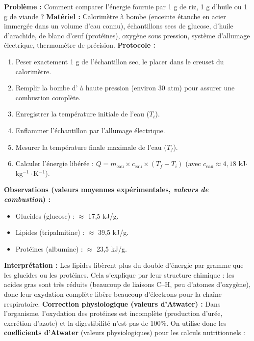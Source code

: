 \documentclass[11pt]{article}
\newcommand{\cle}[1]{{\popxbold\color{popdark}#1}}
\begin{document}
\begin{experience}
\textbf{Problème :} Comment comparer l'énergie fournie par 1 g de riz, 1 g d'huile ou 1 g de viande ?
\textbf{Matériel :} Calorimètre à bombe (enceinte étanche en acier immergée dans un volume d'eau connu), échantillons secs de glucose, d'huile d'arachide, de blanc d'œuf (protéines), oxygène sous pression, système d'allumage électrique, thermomètre de précision.
\textbf{Protocole :}
\begin{enumerate}
    \item Peser exactement 1 g de l'échantillon sec, le placer dans le creuset du calorimètre.
    \item Remplir la bombe d' à haute pression (environ 30 atm) pour assurer une combustion complète.
    \item Enregistrer la température initiale de l'eau ($T_i$).
    \item Enflammer l'échantillon par l'allumage électrique.
    \item Mesurer la température finale maximale de l'eau ($T_f$).
    \item Calculer l'énergie libérée : $Q = m_{\text{eau}} \times c_{\text{eau}} \times (T_f - T_i)$ (avec $c_{\text{eau}} \approx 4,18$ kJ$\cdot$kg$^{-1}\cdot$K$^{-1}$).
\end{enumerate}
\textbf{Observations (valeurs moyennes expérimentales, \emph{valeurs de combustion}) :}
\begin{itemize}
    \item Glucides (glucose) : $\approx$ 17,5 kJ/g.
    \item Lipides (tripalmitine) : $\approx$ 39,5 kJ/g.
    \item Protéines (albumine) : $\approx$ 23,5 kJ/g.
\end{itemize}
\textbf{Interprétation :} Les lipides libèrent plus du double d'énergie par gramme que les glucides ou les protéines. Cela s'explique par leur structure chimique : les acides gras sont très \cle{réduits} (beaucoup de liaisons C--H, peu d'atomes d'oxygène), donc leur oxydation complète libère beaucoup d'électrons pour la chaîne respiratoire.
\textbf{Correction physiologique (valeurs d'Atwater) :} Dans l'organisme, l'oxydation des protéines est incomplète (production d'urée, excrétion d'azote) et la digestibilité n'est pas de 100\%. On utilise donc les \textbf{coefficients d'Atwater} (valeurs physiologiques) pour les calculs nutritionnels :
\end{experience}
\end{document}
